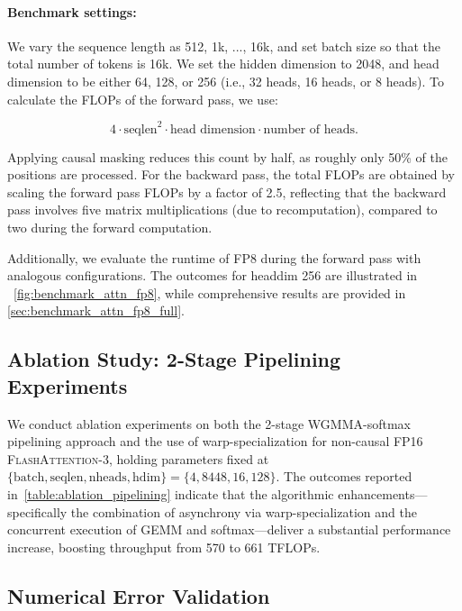 \begin{itemize}
\paragraph{Benchmark settings:} We vary the sequence length as 512, 1k, ..., 16k, and set batch size so that the total number of tokens is 16k. We set the hidden dimension to 2048, and head dimension to be either 64, 128, or 256 (i.e., 32 heads, 16 heads, or 8 heads). To calculate the FLOPs of the forward pass, we use:

\begin{equation*}
  4 \cdot \text{seqlen}^2 \cdot \text{head dimension} \cdot \text{number of heads}.
\end{equation*}

Applying causal masking reduces this count by half, as roughly only 50\% of the positions are processed. For the backward pass, the total FLOPs are obtained by scaling the forward pass FLOPs by a factor of 2.5, reflecting that the backward pass involves five matrix multiplications (due to recomputation), compared to two during the forward computation.

Additionally, we evaluate the runtime of FP8 during the forward pass with analogous configurations. The outcomes for headdim 256 are illustrated in ~\cref{fig:benchmark_attn_fp8}, while comprehensive results are provided in \cref{sec:benchmark_attn_fp8_full}.

\subsection{Ablation Study: 2-Stage Pipelining Experiments}
\label{sec:2-stage-pipelining-experiments}

We conduct ablation experiments on both the 2-stage WGMMA-softmax pipelining approach and the use of warp-specialization for non-causal FP16 \textsc{FlashAttention-3}, holding parameters fixed at $\{\text{batch}, \text{seqlen}, \text{nheads}, \text{hdim}\} = \{ 4, 8448, 16, 128\}$. The outcomes reported in~\cref{table:ablation_pipelining} indicate that the algorithmic enhancements—specifically the combination of asynchrony via warp-specialization and the concurrent execution of GEMM and softmax—deliver a substantial performance increase, boosting throughput from 570 to 661 TFLOPs.

\subsection{Numerical Error Validation}
\label{sec:numerical_error}


\end{itemize}
